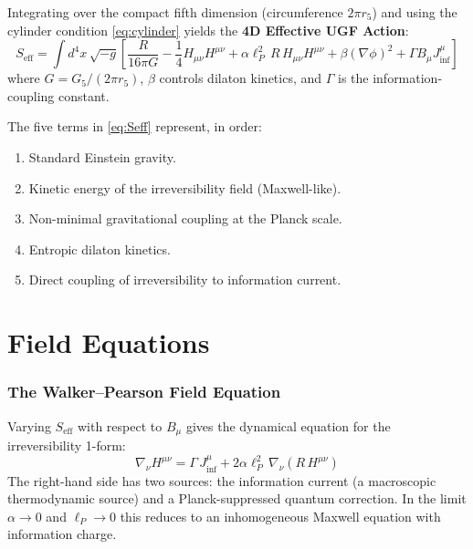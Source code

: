 \documentclass[12pt,a4paper]{article}
\newcommand{\Jinf}{J_{\inf}^{\mu}} %
\newcommand{\lP}{\ell_P}           %
\newcommand{\Seff}{S_{\text{eff}}} %
\begin{document}
Integrating over the compact fifth dimension (circumference $2\pi r_5$) and
using the cylinder condition \eqref{eq:cylinder} yields the
\textbf{4D Effective UGF Action}:
\begin{equation}
  \boxed{
  \Seff = \int d^4x\,\sqrt{-g}\left[
    \frac{R}{16\pi G}
    - \frac{1}{4}H_{\mu\nu}H^{\mu\nu}
    + \alpha\lP^2\,R\,H_{\mu\nu}H^{\mu\nu}
    + \beta(\nabla\phi)^2
    + \Gamma B_\mu \Jinf
  \right]
  }
  \label{eq:Seff}
\end{equation}
where $G = G_5/(2\pi r_5)$, $\beta$ controls dilaton kinetics, and $\Gamma$
is the information-coupling constant.

The five terms in \eqref{eq:Seff} represent, in order:
\begin{enumerate}
  \item Standard Einstein gravity.
  \item Kinetic energy of the irreversibility field (Maxwell-like).
  \item Non-minimal gravitational coupling at the Planck scale.
  \item Entropic dilaton kinetics.
  \item Direct coupling of irreversibility to information current.
\end{enumerate}

\part{Field Equations}

\section{The Walker--Pearson Field Equation}
\label{sec:WP-eq}

Varying $\Seff$ with respect to $B_\mu$ gives the dynamical equation for the
irreversibility 1-form:
\begin{equation}
  \boxed{
  \nabla_\nu H^{\mu\nu}
  = \Gamma\, J_{\inf}^{\mu}
    + 2\alpha\lP^2\,\nabla_\nu\!\left(R\,H^{\mu\nu}\right)
  }
  \label{eq:WP}
\end{equation}
The right-hand side has two sources: the information current (a macroscopic
thermodynamic source) and a Planck-suppressed quantum correction.  In the limit
$\alpha\to 0$ and $\lP\to 0$ this reduces to an inhomogeneous Maxwell equation
with information charge.
\end{document}

